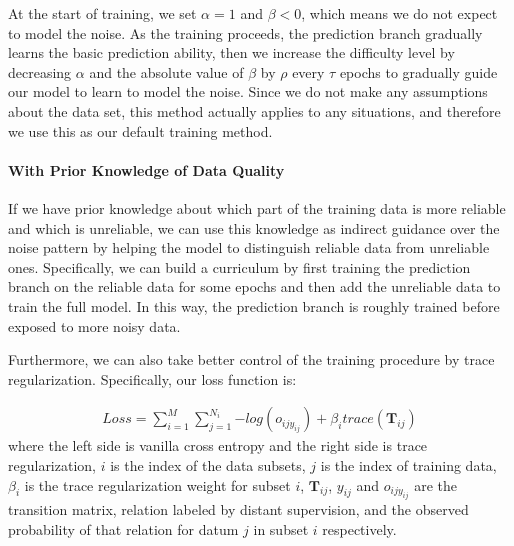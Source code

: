At the start of training, we set $\alpha=1$ and $\beta<0$, which means we do not expect to model the noise. As the training proceeds, the prediction branch gradually learns the basic prediction ability, then we increase the difficulty level by decreasing $\alpha$ and the absolute value of $\beta$ by $\rho$ every $\tau$ epochs to gradually guide our model to learn to model the noise. Since we do not make any assumptions about the data set, this method actually applies to any situations, and therefore we use this as our default training method.

\paragraph{With Prior Knowledge of Data Quality}
If we have prior knowledge about which part of the training data is more reliable and which is unreliable, we can use this knowledge as indirect guidance over the noise pattern by helping the model to distinguish reliable data from unreliable ones. Specifically, we can build a curriculum by first training the prediction branch on the reliable data for some epochs and then add the unreliable data to train the full model. In this way, the prediction branch is roughly trained before exposed to more noisy data.

Furthermore, we can also take better control of the training procedure by trace regularization.
Specifically, our loss function is:

\begin{equation}
\begin{aligned}
Loss=\sum_{i=1}^M{\sum_{j=1}^{N_i}{-log(o_{ijy_{ij}})}} + \beta_i trace(\mathbf{T}_{ij})
\end{aligned}
\end{equation}
where the left side is vanilla cross entropy and the right side is trace regularization, $i$ is the index of the data subsets, $j$ is the index of training data, $\beta_i$ is the trace regularization weight for subset $i$, $\mathbf{T}_{ij}$, $y_{ij}$ and $o_{ijy_{ij}}$ are the transition matrix, relation labeled by distant supervision, and the observed probability of that relation for datum $j$ in subset $i$ respectively.

